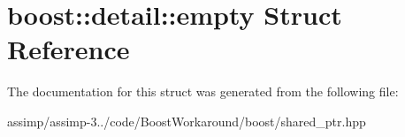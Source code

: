 \hypertarget{structboost_1_1detail_1_1empty}{\section{boost\+:\+:detail\+:\+:empty Struct Reference}
\label{structboost_1_1detail_1_1empty}
}


The documentation for this struct was generated from the following file\+:\begin{DoxyCompactItemize}
\item 
assimp/assimp-\/3../code/\+Boost\+Workaround/boost/shared\+\_\+ptr.\+hpp\end{DoxyCompactItemize}
